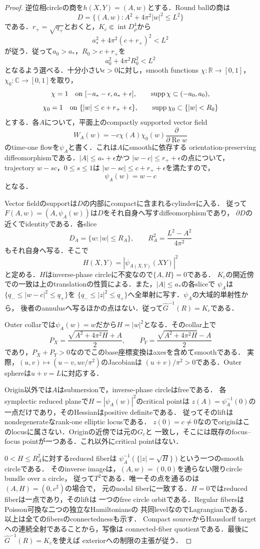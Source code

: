 \begin{proof}
逆位相circleの商を$h(X,Y)=(A,w)$とする．Round ballの商は
\[
 D=\{(A,w):A^2+4\pi^2|w|^2\le L^2\}
\]
である．$r_+=\sqrt{q_+}$とおくと，$K_c\Subset\operatorname{int}D^4_\rho$から
\[
 a_*^2+4\pi^2(c+r_+)^2<L^2
\]
が従う．従って$a_0>a_*$，$R_0>c+r_+$を
\[
 a_0^2+4\pi^2R_0^2<L^2
\]
となるよう選べる．十分小さい$\epsilon>0$に対し，smooth functions
$\chi:\mathbb R\to[0,1]$，$\chi_0:\mathbb C\to[0,1]$を取り，
\[
 \chi=1\quad\hbox{on }[-a_*-\epsilon,a_*+\epsilon],
 \qquad\operatorname{supp}\chi\subset(-a_0,a_0),
\]
\[
 \chi_0=1\quad\hbox{on }\{|w|\le c+r_++\epsilon\},
 \qquad\operatorname{supp}\chi_0\subset\{|w|<R_0\}
\]
とする．各$A$について，平面上のcompactly supported vector field
\[
 W_A(w)=-c\chi(A)\chi_0(w)\frac{\partial}{\partial\operatorname{Re}w}
\]
のtime-one flowを$\psi_A$と書く．これは$A$にsmoothに依存する
orientation-preserving diffeomorphismである．$|A|\le a_*+\epsilon$かつ
$|w-c|\le r_++\epsilon$の点について，trajectory $w-sc$，$0\le s\le1$は
$|w-sc|\le c+r_++\epsilon$を満たすので，
\[
 \psi_A(w)=w-c
\]
となる．

Vector fieldのsupportは$D$の内部にcompactに含まれるcylinderに入る．
従って$F(A,w)=(A,\psi_A(w))$は$D$をそれ自身へ写すdiffeomorphismであり，
$\partial D$の近くでidentityである．各slice
\[
 D_A=\{w:|w|\le R_A\},\qquad
 R_A^2=\frac{L^2-A^2}{4\pi^2}
\]
もそれ自身へ写る．そこで
\[
 H(X,Y)=|\psi_{A(X,Y)}(XY)|^2
\]
と定める．$H$はinverse-phase circleに不変なので$\{A,H\}=0$である．
$K_c$の開近傍での一致は上のtranslationの性質による．また，$|A|\le a_*$の各sliceで
$\psi_A$は$\{q_-\le|w-c|^2\le q_+\}$を
$\{q_-\le|z|^2\le q_+\}$へ全単射に写す．$\psi_A$の大域的単射性から，
後者のannulusへ写るほかの点はない．従って$\widehat G^{-1}(R)=K_c$である．

Outer collarでは$\psi_A(w)=w$だから$H=|w|^2$となる．そのcollar上で
\[
 P_X=\frac{\sqrt{A^2+4\pi^2H}+A}{2},\qquad
 P_Y=\frac{\sqrt{A^2+4\pi^2H}-A}{2}
\]
であり，$P_X+P_Y>0$なのでこのbase座標変換はaxesを含めてsmoothである．
実際，$(u,v)\mapsto(u-v,uv/\pi^2)$のJacobianは
$(u+v)/\pi^2>0$である．Outer sphereは$u+v=L$に対応する．

Origin以外では$A$はsubmersionで，inverse-phase circleはfreeである．
各symplectic reduced planeで$H=|\psi_A(w)|^2$のcritical pointは
$z(A)=\psi_A^{-1}(0)$の一点だけであり，そのHessianはpositive definiteである．
従ってそのliftはnondegenerateなrank-one elliptic locusである．
$z(0)=c\ne0$なのでoriginはこのlocusに属さない．Originの近傍では元の$G_c$と
一致し，そこには既存のfocus--focus pointが一つある．これ以外にcritical pointはない．

$0<H\le R_A^2$に対するreduced fiberは
$\psi_A^{-1}(\{|z|=\sqrt H\})$という一つのsmooth circleである．
そのinverse imageは，$(A,w)=(0,0)$を通らない限りcircle bundle over a circle，
従って$T^2$である．唯一その点を通るのは$(A,H)=(0,c^2)$の場合で，
元のnodal fiberに一致する．$H=0$ではreduced fiberは一点であり，そのliftは
一つのfree circle orbitである．Regular fibersはPoisson可換な二つの独立なHamiltoniansの
共同levelなのでLagrangianである．以上は全てのfibersのconnectednessも示す．
Compact sourceからHausdorff targetへの連続全射であることから，写像は
connected-fiber quotientである．最後に$\widehat G^{-1}(R)=K_c$を使えば
exteriorへの制限の主張が従う．
\end{proof}


